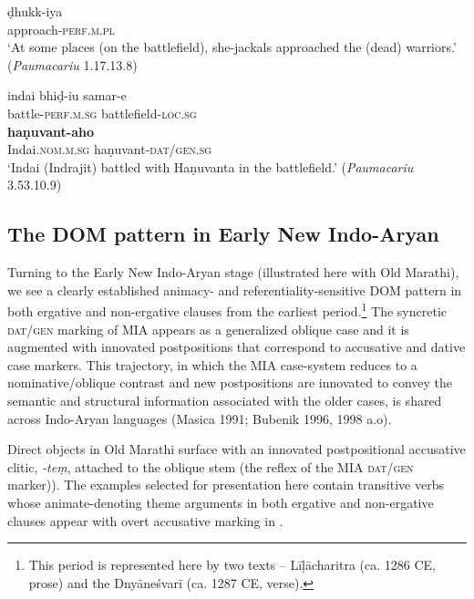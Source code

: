 \documentclass[output=paper,
modfonts
]{LSP/langsci}
\begin{document}
\begin{exe}
\begin{xlist}
\gll ḍhukk-iya \\
approach-\textsc{perf.m.pl} \\
\glt `At some places (on the battlefield), she-jackals approached the (dead) warriors.' (\textit{Paumacariu} 1.17.13.8)

\ex\gll indai bhiḍ-iu samar-e \\
battle-\textsc{perf.m.sg} battlefield-\textsc{loc.sg} \\

\gll \textbf{haṇuvant-aho}\\ Indai.\textsc{nom.m.sg} 
haṇuvant-\textsc{dat/gen.sg} \\
\glt `Indai (Indrajit)  battled with Haṇuvanta in the battlefield.'  (\textit{Paumacariu} 3.53.10.9)
\end{xlist}
\end{exe}



    \subsection{The DOM pattern in Early New Indo-Aryan} 
Turning to the Early New Indo-Aryan stage (illustrated here with Old Marathi), we see a clearly established  animacy- and referentiality-sensitive DOM pattern in both ergative and non-ergative clauses from the earliest period.\footnote{This  period is represented here  by two texts --  Līḷācharitra (ca. 1286 CE, prose) and  the Dnyāneśvarī (ca. 1287 CE, verse).
} The syncretic \textsc{dat/gen} marking of MIA appears as a generalized oblique case and it is augmented with innovated postpositions that correspond to accusative and dative case markers. This trajectory, in which the MIA case-system reduces to a nominative/oblique contrast and new postpositions are innovated to convey the semantic and structural information  associated with the older cases,  is shared across Indo-Aryan languages (Masica 1991; Bubenik 1996, 1998 a.o). 

Direct objects in Old Marathi surface with an innovated postpositional accusative clitic,  \textit{-teṃ}, attached to the oblique stem (the reflex of the MIA \textsc{dat/gen} marker)).   The examples selected for presentation here contain transitive verbs whose animate-denoting theme arguments in both ergative and non-ergative clauses appear with   overt accusative marking in . 
\end{document}
